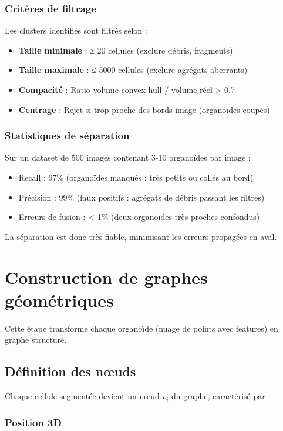 \subsubsection{Critères de filtrage}

Les clusters identifiés sont filtrés selon :
\begin{itemize}
    \item \textbf{Taille minimale} : ≥ 20 cellules (exclure débris, fragments)
    \item \textbf{Taille maximale} : ≤ 5000 cellules (exclure agrégats aberrants)
    \item \textbf{Compacité} : Ratio volume convex hull / volume réel > 0.7
    \item \textbf{Centrage} : Rejet si trop proche des bords image (organoïdes coupés)
\end{itemize}

\subsubsection{Statistiques de séparation}

Sur un dataset de 500 images contenant 3-10 organoïdes par image :
\begin{itemize}
    \item Recall : 97\% (organoïdes manqués : très petits ou collés au bord)
    \item Précision : 99\% (faux positifs : agrégats de débris passant les filtres)
    \item Erreurs de fusion : < 1\% (deux organoïdes très proches confondus)
\end{itemize}

La séparation est donc très fiable, minimisant les erreurs propagées en aval.

\section{Construction de graphes géométriques}

Cette étape transforme chaque organoïde (nuage de points avec features) en graphe structuré.

\subsection{Définition des nœuds}

Chaque cellule segmentée devient un nœud $v_i$ du graphe, caractérisé par :

\subsubsection{Position 3D}

